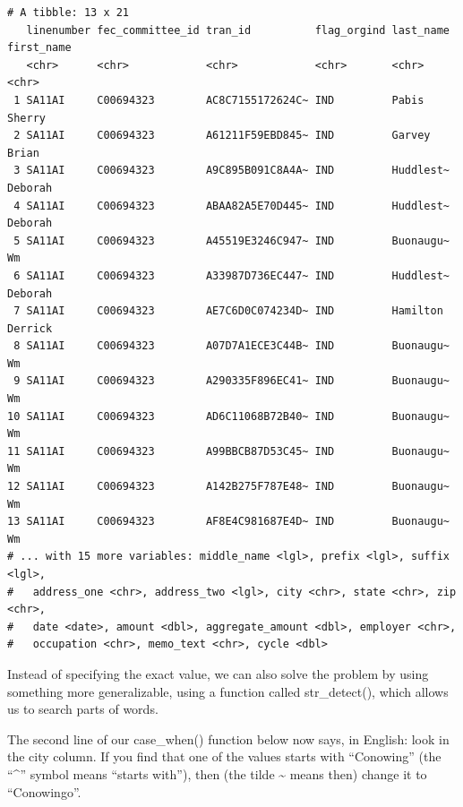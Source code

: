 \documentclass[
  letterpaper,
  DIV=11,
  numbers=noendperiod]{scrreprt}
\begin{document}
\begin{verbatim}
# A tibble: 13 x 21
   linenumber fec_committee_id tran_id          flag_orgind last_name first_name
   <chr>      <chr>            <chr>            <chr>       <chr>     <chr>     
 1 SA11AI     C00694323        AC8C7155172624C~ IND         Pabis     Sherry    
 2 SA11AI     C00694323        A61211F59EBD845~ IND         Garvey    Brian     
 3 SA11AI     C00694323        A9C895B091C8A4A~ IND         Huddlest~ Deborah   
 4 SA11AI     C00694323        ABAA82A5E70D445~ IND         Huddlest~ Deborah   
 5 SA11AI     C00694323        A45519E3246C947~ IND         Buonaugu~ Wm        
 6 SA11AI     C00694323        A33987D736EC447~ IND         Huddlest~ Deborah   
 7 SA11AI     C00694323        AE7C6D0C074234D~ IND         Hamilton  Derrick   
 8 SA11AI     C00694323        A07D7A1ECE3C44B~ IND         Buonaugu~ Wm        
 9 SA11AI     C00694323        A290335F896EC41~ IND         Buonaugu~ Wm        
10 SA11AI     C00694323        AD6C11068B72B40~ IND         Buonaugu~ Wm        
11 SA11AI     C00694323        A99BBCB87D53C45~ IND         Buonaugu~ Wm        
12 SA11AI     C00694323        A142B275F787E48~ IND         Buonaugu~ Wm        
13 SA11AI     C00694323        AF8E4C981687E4D~ IND         Buonaugu~ Wm        
# ... with 15 more variables: middle_name <lgl>, prefix <lgl>, suffix <lgl>,
#   address_one <chr>, address_two <lgl>, city <chr>, state <chr>, zip <chr>,
#   date <date>, amount <dbl>, aggregate_amount <dbl>, employer <chr>,
#   occupation <chr>, memo_text <chr>, cycle <dbl>
\end{verbatim}

Instead of specifying the exact value, we can also solve the problem by
using something more generalizable, using a function called
str\_detect(), which allows us to search parts of words.

The second line of our case\_when() function below now says, in English:
look in the city column. If you find that one of the values starts with
``Conowing'' (the ``\^{}'' symbol means ``starts with''), then (the
tilde \textasciitilde{} means then) change it to ``Conowingo''.
\end{document}
